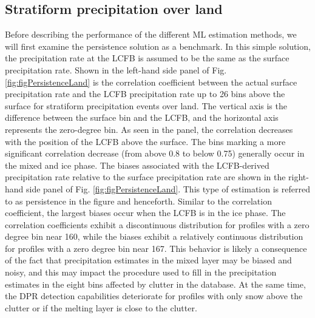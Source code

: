 \documentclass{ametsocV6.1} %
\begin{document}
\subsection{Stratiform precipitation over land}
Before describing the performance of the different ML estimation methods, we will first examine the persistence solution as a benchmark. In this simple solution, the precipitation rate at the LCFB is assumed to be the same as the surface precipitation rate. Shown in the left-hand side panel of Fig. \ref{fig:figPersistenceLand} is the correlation coefficient between the actual surface precipitation rate and the LCFB precipitation rate up to 26 bins above the surface for stratiform precipitation events over land. The vertical axis is the difference between the surface bin and the LCFB, and the horizontal axis represents the zero-degree bin. As seen in the panel, the correlation decreases with the position of the LCFB above the surface.  The bins marking a more significant correlation decrease (from above 0.8 to below 0.75) generally occur in the mixed and ice phase.  The biases associated with the LCFB-derived precipitation rate relative to the surface precipitation rate are shown in the right-hand side panel of Fig. \ref{fig:figPersistenceLand}. This type of estimation is referred to as persistence in the figure and henceforth. Similar to the correlation coefficient, the largest biases occur when the LCFB is in the ice phase.  The correlation coefficients exhibit a discontinuous distribution for profiles with a zero degree bin near 160, while the biases exhibit a relatively continuous distribution for profiles with a zero degree bin near 167. This behavior is likely a consequence of the fact that precipitation estimates in the mixed layer may be biased and noisy, and this may impact the procedure used to fill in the precipitation estimates in the eight bins affected by clutter in the database. At the same time, the DPR detection capabilities deteriorate for profiles with only snow above the clutter or if the melting layer is close to the clutter.
\end{document}
